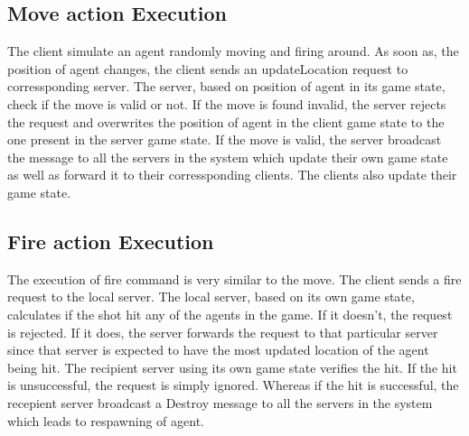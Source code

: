 \subsection{Move action Execution}
	The client simulate an agent randomly moving and firing around. As soon as, the position of agent changes, the client sends an updateLocation request to corressponding server. The server, based on position of agent in its game state, check if the move is valid or not. 
	If the move is found invalid, the server rejects the request and overwrites the position of agent in the client game state to the one present in the server game state.
	If the move is valid, the server broadcast the message to all the servers in the system which update their own game state as well as forward it to their corressponding clients. The clients also update their game state.

\subsection{Fire action Execution}
	The execution of fire command is very similar to the move. The client sends a fire request to the local server. The local server, based on its own game state, calculates if the shot hit any of the agents in the game. If it doesn't, the request is rejected. If it does, the server forwards the request to that particular server since that server is expected to have the most updated location of the agent being hit. The recipient server using its own game state verifies the hit. If the hit is unsuccessful, the request is simply ignored. Whereas if the hit is successful, the recepient server broadcast a Destroy message to all the servers in the system which leads to respawning of agent.